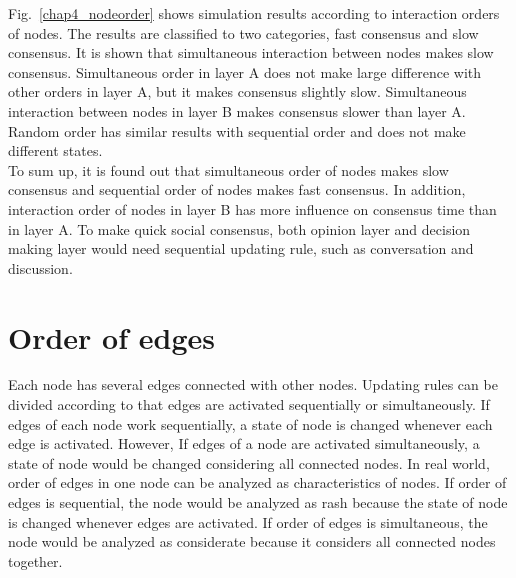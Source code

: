 Fig.~\ref{chap4_nodeorder} shows simulation results according to interaction orders of nodes. The results are classified to two categories, fast consensus and slow consensus. It is shown that simultaneous interaction between nodes makes slow consensus. Simultaneous order in layer A does not make large difference with other orders in layer A, but it makes consensus slightly slow. Simultaneous interaction between nodes in layer B makes consensus slower than layer A. Random order has similar results with sequential order and does not make different states. \\
To sum up, it is found out that simultaneous order of nodes makes slow consensus and sequential order of nodes makes fast consensus. In addition, interaction order of nodes in layer B has more influence on consensus time than in layer A. To make quick social consensus, both opinion layer and decision making layer would need sequential updating rule, such as conversation and discussion.\\      

\section{Order of edges}
Each node has several edges connected with other nodes. Updating rules can be divided according to that edges are activated sequentially or simultaneously. If edges of each node work sequentially, a state of node is changed whenever each edge is activated. However, If edges of a node are activated simultaneously, a state of node would be changed considering all connected nodes. In real world, order of edges in one node can be analyzed as characteristics of nodes. If order of edges is sequential, the node would be analyzed as rash because the state of node is changed whenever edges are activated. If order of edges is simultaneous, the node would be analyzed as considerate because it considers all connected nodes together. 

